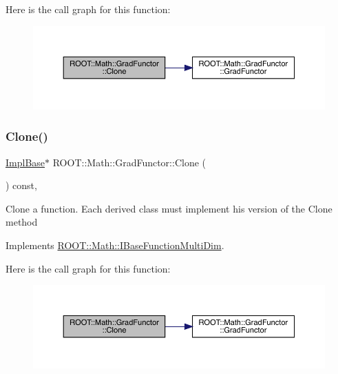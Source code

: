 Here is the call graph for this function\+:
\nopagebreak
\begin{figure}[H]
\begin{center}
\leavevmode
\includegraphics[width=350pt]{de/d74/classROOT_1_1Math_1_1GradFunctor_a21093c0d3001069e49ce6278b5a32a40_cgraph}
\end{center}
\end{figure}
\mbox{\label{classROOT_1_1Math_1_1GradFunctor_a21093c0d3001069e49ce6278b5a32a40}} 
\subsubsection{\texorpdfstring{Clone()}{Clone()}\hspace{0.1cm}{\footnotesize\ttfamily [2/2]}}
{\footnotesize\ttfamily \mbox{\hyperlink{classROOT_1_1Math_1_1GradFunctor_a1fb9161fc93c7e7fa185dddbcc2c4f4d}{Impl\+Base}}$\ast$ R\+O\+O\+T\+::\+Math\+::\+Grad\+Functor\+::\+Clone (\begin{DoxyParamCaption}{ }\end{DoxyParamCaption}) const\hspace{0.3cm}{\ttfamily [inline]}, {\ttfamily [virtual]}}

Clone a function. Each derived class must implement his version of the Clone method 

Implements \mbox{\hyperlink{classROOT_1_1Math_1_1IBaseFunctionMultiDim_a57939204b1f525b43835b42e0635dd3b}{R\+O\+O\+T\+::\+Math\+::\+I\+Base\+Function\+Multi\+Dim}}.

Here is the call graph for this function\+:
\nopagebreak
\begin{figure}[H]
\begin{center}
\leavevmode
\includegraphics[width=350pt]{de/d74/classROOT_1_1Math_1_1GradFunctor_a21093c0d3001069e49ce6278b5a32a40_cgraph}
\end{center}
\end{figure}
\mbox{\label{classROOT_1_1Math_1_1GradFunctor_a7ff4ed4ad6f7c17d74403a443990f069}} 
